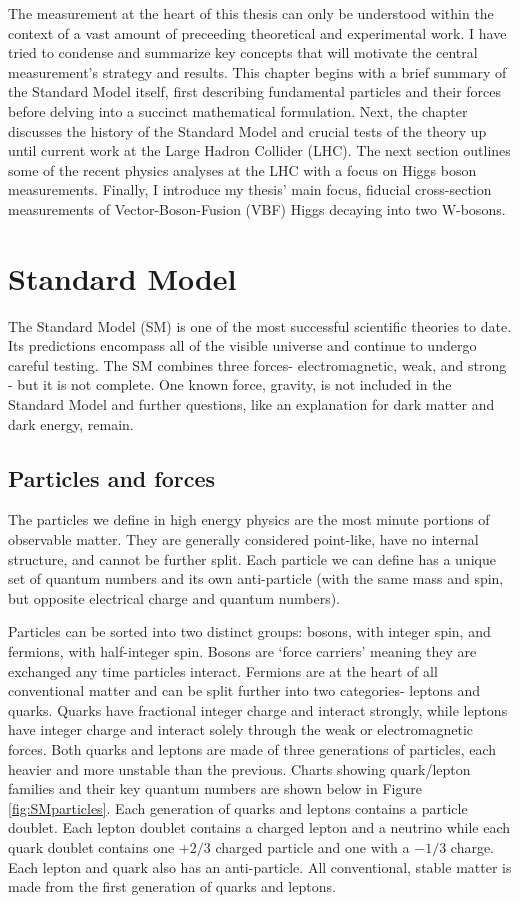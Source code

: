 The measurement at the heart of this thesis can only be understood within the context of a vast amount of preceeding theoretical and experimental work. I have tried to condense and summarize key concepts that will motivate the central measurement's strategy and results. This chapter begins with a brief summary of the Standard Model itself, first describing fundamental particles and their forces before delving into a succinct mathematical formulation. Next, the chapter discusses the history of the Standard Model and crucial tests of the theory up until current work at the Large Hadron Collider (LHC). The next section outlines some of the recent physics analyses at the LHC with a focus on Higgs boson measurements. Finally, I introduce my thesis' main focus, fiducial cross-section measurements of Vector-Boson-Fusion (VBF) Higgs decaying into two W-bosons.

\section{Standard Model}

The Standard Model (SM) is one of the most successful scientific theories to date. Its predictions encompass all of the visible universe and continue to undergo careful testing. The SM combines three forces- electromagnetic, weak, and strong - but it is not complete. One known force, gravity, is not included in the Standard Model and further questions, like an explanation for dark matter and dark energy, remain. 

\subsection{Particles and forces}
The particles we define in high energy physics are the most minute portions of observable matter. They are generally considered point-like, have no internal structure, and cannot be further split. Each particle we can define has a unique set of quantum numbers and its own anti-particle (with the same mass and spin, but opposite electrical charge and quantum numbers).

Particles can be sorted into two distinct groups: bosons, with integer spin, and fermions, with half-integer spin. Bosons are `force carriers' meaning they are exchanged any time particles interact. Fermions are at the heart of all conventional matter and can be split further into two categories- leptons and quarks. Quarks have fractional integer charge and interact strongly, while leptons have integer charge and interact solely through the weak or electromagnetic forces. Both quarks and leptons are made of three generations of particles, each heavier and more unstable than the previous. Charts showing quark/lepton families and their key quantum numbers are shown below in Figure \ref{fig:SMparticles}. Each generation of quarks and leptons contains a particle doublet. Each lepton doublet contains a charged lepton and a neutrino while each quark doublet contains one $+2/3$ charged particle and one with a $-1/3$ charge. Each lepton and quark also has an anti-particle. All conventional, stable matter is made from the first generation of quarks and leptons.

